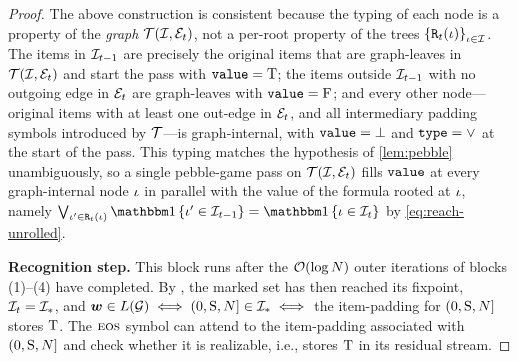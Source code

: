 \documentclass{article}
\begin{document}
\begin{proof}
    The above construction is consistent because the typing of each node is a property of the \emph{graph} ${{ \mathcal{T}}}({{\mathcal{I}}}, {\mathcal{E}}_t)$, not a per-root property of the trees ${{\{ {\mathtt{R}}_t({{ \iota}}) \}}}_{{{ \iota}} \in {{\mathcal{I}}}}$.
    The items in ${{\mathcal{I}}}_{t-1}$ are precisely the original items that are graph-leaves in ${{ \mathcal{T}}}({{\mathcal{I}}}, {\mathcal{E}}_t)$ and start the pass with ${\mathtt{value}} = {\mathbin{\mathrm{T}}}$; the items outside ${{\mathcal{I}}}_{t-1}$ with no outgoing edge in ${\mathcal{E}}_t$ are graph-leaves with ${\mathtt{value}} = {\mathbin{\mathrm{F}}}$; and every other node---original items with at least one out-edge in ${\mathcal{E}}_t$, and all intermediary padding symbols introduced by ${{ \mathcal{T}}}$---is graph-internal, with ${\mathtt{value}} = \bot$ and ${\mathtt{type}} = \lor$ at the start of the pass.
    This typing matches the hypothesis of \cref{lem:pebble} unambiguously, so a single pebble-game pass on ${{ \mathcal{T}}}({{\mathcal{I}}}, {\mathcal{E}}_t)$ fills ${\mathtt{value}}$ at every graph-internal node ${{ \iota}}$ in parallel with the value of the formula rooted at ${{ \iota}}$, namely $\bigvee_{\itm' \in \reachable_t(\itm)} \ind{\itm' \in \items_{t-1}} = \ind{\itm \in \items_t}$ by \cref{eq:reach-unrolled}.
    
    \textbf{Recognition step.}
    This block runs after the ${{ \mathcal{O}}}(\log {{ N}})$ outer iterations of blocks (1)--(4) have completed. By \citet{chytil-unambiguous}, the marked set has then reached its fixpoint, ${{\mathcal{I}}}_t = {{\mathcal{I}}}_*$, and ${{\boldsymbol{w}}} \in {L}({{ \mathcal{G}}}) \iff (0, {{ \mathrm{S}}}, {{ N}}] \in {{\mathcal{I}}}_* \iff$ the item-padding for $(0, {{ \mathrm{S}}}, {{ N}}]$ stores ${\mathbin{\mathrm{T}}}$.
    The ${{\textsc{eos}}}$ symbol can attend to the item-padding associated with $(0, {{ \mathrm{S}}}, {{ N}}]$ and check whether it is realizable, i.e., stores ${\mathbin{\mathrm{T}}}$ in its residual stream.
    

\end{proof}
\end{document}
